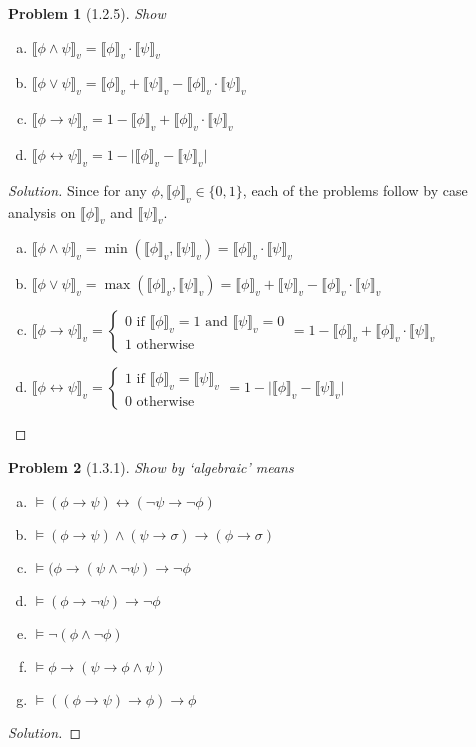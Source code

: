 \documentclass[letter]{article}
\newtheorem{problem}{Problem}
\theoremstyle{definition}
\newenvironment{solution}
{\begin{proof}[Solution]}
	{\end{proof}}
\begin{document}
\newcommand{\den}[1]{\llbracket #1 \rrbracket_v}
\begin{problem}[1.2.5]
    Show
 \begin{enumerate}[(a)]
 \item $\den{\phi \land \psi} = \den{\phi} \cdot \den{\psi}$
 \item $\den{\phi \lor \psi} = \den{\phi} + \den{\psi} - \den{\phi} \cdot \den\psi$
 \item $\den{\phi \to \psi} = 1 - \den{\phi} + \den{\phi} \cdot \den{\psi}$
 \item $\den{\phi \leftrightarrow \psi} = 1 - \big|\den{\phi} - \den{\psi} \big|$
 \end{enumerate}
\end{problem}
\begin{solution}
  Since for any $\phi, \den{\phi} \in \{0, 1\}$, each of the problems follow by case analysis on $\den{\phi}$ and $\den{\psi}$.
  \begin{enumerate}[(a)]
  \item
    $\den{\phi \land \psi} = \min(\den{\phi}, \den{\psi}) = \den{\phi} \cdot \den{\psi}$
  \item
    $\den{\phi \lor \psi} = \max(\den{\phi}, \den{\psi}) = \den{\phi} + \den{\psi} - \den{\phi} \cdot \den\psi$
  \item
    $\den{\phi \to \psi} =
    \begin{cases}
      0 \text{ if $\den{\phi} = 1$ and $\den{\psi} = 0$} \\
      1 \text{ otherwise}
    \end{cases}
    = 1 - \den{\phi} + \den{\phi} \cdot \den{\psi}$
  \item
    $\den{\phi \leftrightarrow \psi} =
    \begin{cases}
      1 \text{ if $\den{\phi} = \den{\psi}$} \\
      0 \text{ otherwise}
    \end{cases}
    = 1 - \big|\den{\phi} - \den{\psi} \big|$
  \end{enumerate}
\end{solution}

\begin{problem}[1.3.1] Show by `algebraic' means
 \begin{enumerate}[(a)]
     \item $\models (\phi \to \psi) \leftrightarrow (\neg \psi \to \neg \phi)$
     \item $\models (\phi \to \psi) \land (\psi \to \sigma) \to (\phi \to \sigma)$
     \item $\models (\phi \to (\psi \land \neg \psi) \to \neg \phi$
     \item $\models (\phi \to \neg \psi) \to \neg \phi$
     \item $\models \neg (\phi \land \neg \phi)$
     \item $\models \phi \to (\psi \to \phi \land \psi)$
     \item $\models ((\phi \to \psi) \to \phi) \to \phi$
 \end{enumerate}
\end{problem}
\begin{solution}
\end{solution}
\end{document}
